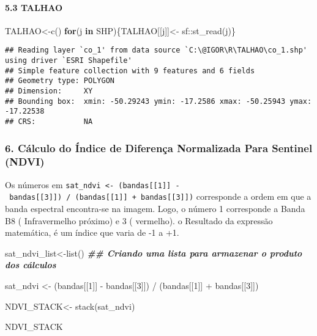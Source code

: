 \documentclass[
]{article}
\newenvironment{Shaded}{\begin{snugshade}}{\end{snugshade}}
\newcommand{\ControlFlowTok}[1]{\textcolor[rgb]{0.13,0.29,0.53}{\textbf{#1}}}
\newcommand{\DecValTok}[1]{\textcolor[rgb]{0.00,0.00,0.81}{#1}}
\newcommand{\DocumentationTok}[1]{\textcolor[rgb]{0.56,0.35,0.01}{\textbf{\textit{#1}}}}
\newcommand{\FunctionTok}[1]{\textcolor[rgb]{0.00,0.00,0.00}{#1}}
\newcommand{\NormalTok}[1]{#1}
\newcommand{\OtherTok}[1]{\textcolor[rgb]{0.56,0.35,0.01}{#1}}
\newcommand{\SpecialCharTok}[1]{\textcolor[rgb]{0.00,0.00,0.00}{#1}}
\begin{document}
\hypertarget{talhao}{%
\paragraph{5.3 TALHAO}\label{talhao}}

\begin{Shaded}
\begin{Highlighting}[]
\NormalTok{TALHAO}\OtherTok{\textless{}{-}}\FunctionTok{c}\NormalTok{()                                                           }
\ControlFlowTok{for}\NormalTok{(j }\ControlFlowTok{in}\NormalTok{ SHP)\{TALHAO[[j]]}\OtherTok{\textless{}{-}}\NormalTok{ sf}\SpecialCharTok{::}\FunctionTok{st\_read}\NormalTok{(j)\} }
\end{Highlighting}
\end{Shaded}

\begin{verbatim}
## Reading layer `co_1' from data source `C:\@IGOR\R\TALHAO\co_1.shp' using driver `ESRI Shapefile'
## Simple feature collection with 9 features and 6 fields
## Geometry type: POLYGON
## Dimension:     XY
## Bounding box:  xmin: -50.29243 ymin: -17.2586 xmax: -50.25943 ymax: -17.22538
## CRS:           NA
\end{verbatim}

\hypertarget{cuxe1lculo-do-uxedndice-de-diferenuxe7a-normalizada-para-sentinel-ndvi}{%
\subsubsection{6. Cálculo do Índice de Diferença Normalizada Para
Sentinel
(NDVI)}\label{cuxe1lculo-do-uxedndice-de-diferenuxe7a-normalizada-para-sentinel-ndvi}}

Os números em
\texttt{sat\_ndvi\ \textless{}-\ (bandas{[}{[}1{]}{]}\ -\ bandas{[}{[}3{]}{]})\ /\ (bandas{[}{[}1{]}{]}\ +\ bandas{[}{[}3{]}{]})}
corresponde a ordem em que a banda espectral encontra-se na imagem.
Logo, o número 1 corresponde a Banda B8 ( Infravermelho próximo) e 3 (
vermelho). o Resultado da expressão matemática, é um índice que varia de
-1 a +1.

\begin{Shaded}
\begin{Highlighting}[]
\NormalTok{sat\_ndvi\_list}\OtherTok{\textless{}{-}}\FunctionTok{list}\NormalTok{() }\DocumentationTok{\#\# Criando uma lista para armazenar o produto dos cálculos}

\NormalTok{sat\_ndvi }\OtherTok{\textless{}{-}}\NormalTok{ (bandas[[}\DecValTok{1}\NormalTok{]] }\SpecialCharTok{{-}}\NormalTok{ bandas[[}\DecValTok{3}\NormalTok{]]) }\SpecialCharTok{/}\NormalTok{ (bandas[[}\DecValTok{1}\NormalTok{]] }\SpecialCharTok{+}\NormalTok{ bandas[[}\DecValTok{3}\NormalTok{]])}

\NormalTok{NDVI\_STACK}\OtherTok{\textless{}{-}} \FunctionTok{stack}\NormalTok{(sat\_ndvi)}

\NormalTok{NDVI\_STACK}
\end{Highlighting}
\end{Shaded}
\end{document}
